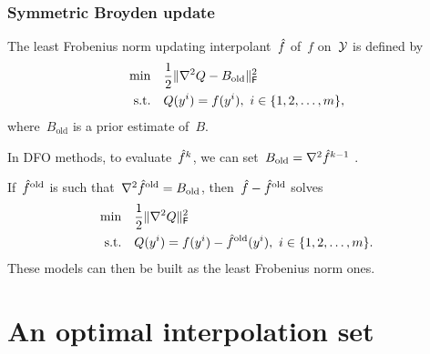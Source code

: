 \documentclass{polyu-presentation}
\newcommand{\obj}{f}
\newcommand{\objm}[1][]{\hat{f}\ifthenelse{\equal{#1}{}}{}{^{#1}}}
\newcommand{\xpt}[1][]{\mathcal{Y}\ifthenelse{\equal{#1}{}}{}{^{#1}}}
\begin{document}
\begin{frame}
    \frametitle{Symmetric Broyden update}

    The \alert{least Frobenius norm updating} interpolant~$\objm$ of~$\obj$ on~$\xpt$ is defined by
    \begin{align*}
        \min        & \quad \frac{1}{2} \norm{\nabla^2 Q - B_{\text{old}}}_{\mathsf{F}}^2    \\
        \text{s.t.} & \quad Q(y^i) = \obj(y^i), ~ i \in \set{1, 2, \dots, m},
    \end{align*}
    where~$B_{\text{old}}$ is a \alert{prior estimate} of~$B$.

    \begin{block}{}
        In \alert{DFO methods}, to evaluate~$\objm[k]$, we can set~$B_{\text{old}} = \nabla^2 \objm[k - 1]$ \parencite{Powell_2004b}.
    \end{block}

    \medskip

    If~$\objm[\text{old}]$ is such that~$\nabla^2 \objm[\text{old}] = B_{\text{old}}$, then~$\objm - \objm[\text{old}]$ solves
    \begin{align*}
        \min        & \quad \frac{1}{2} \norm{\nabla^2 Q}_{\mathsf{F}}^2    \\
        \text{s.t.} & \quad Q(y^i) = \obj(y^i) - \objm[\text{old}](y^i), ~ i \in \set{1, 2, \dots, m}.
    \end{align*}
    These models can then be built as the least Frobenius norm ones.
\end{frame}

\section{An optimal interpolation set}
\end{document}
